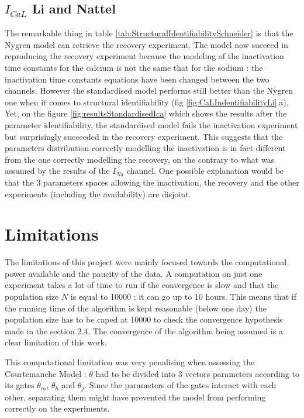 \documentclass[11pt]{report}
\begin{document}
\subsection{$I_{CaL}$ Li and Nattel \cite{Li1997}}

The remarkable thing in table \ref{tab:StructuralIdentifiabilitySchneider} is that the Nygren \cite{Nygren1998} model can retrieve the recovery experiment. The model now succeed in reproducing the recovery experiment because the modeling of the inactivation time constants for the calcium is not the same that for the sodium : the inactivation time constants equations have been changed between the two channels. However the standardised model performs still better than the Nygren one \cite{Nygren1998} when it comes to structural identifiability (fig \ref{fig:CaLIndentifiabilityLi}.a). Yet, on the figure \ref{fig:resultsStandardisedIca} which shows the results after the parameter identifiability, the standardised model fails the inactivation experiment but surprisingly succeeded in the recovery experiment. This suggests that the parameters distribution correctly modelling the inactivation is in fact different from the one correctly modelling the recovery, on the contrary to what was assumed by the results of the $I_{Na}$ channel. One possible explanation would be that the 3 parameters spaces allowing the inactivation, the recovery and the other experiments (including the availability) are disjoint.  


\section{Limitations}

The limitations of this project were mainly focused towards the computational power available and the paucity of the data. A computation on just one experiment takes a lot of time to run if the convergence is slow and that the population size $N$ is equal to 10000 : it can go up to 10 hours. This means that if the running time of the algorithm is kept reasonable (below one day) the population size has to be caped at 10000 to check the convergence hypothesis made in the section 2.4. The convergence of the algorithm being assumed is a clear limitation of this work.

This computational limitation was very penalising when assessing the Courtemanche Model \cite{Courtemanche1998} : $\theta$ had to be divided into 3 vectors parameters according to its gates $\theta_m$, $\theta_h$ and $\theta_j$. Since the parameters of the gates interact with each other, separating them might have prevented the model from performing correctly on the experiments.
\end{document}
